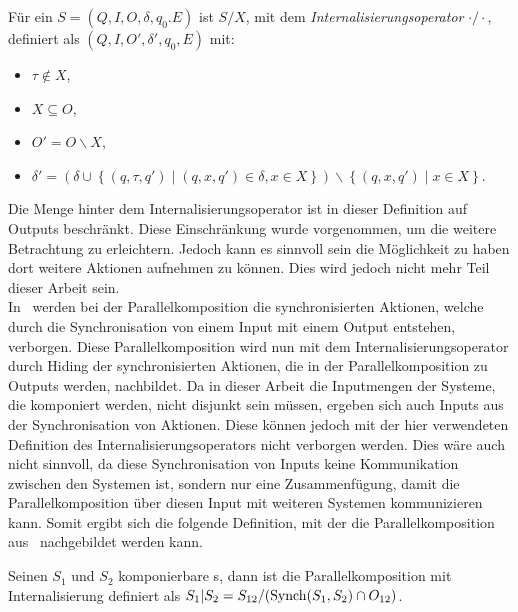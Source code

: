 \begin{Def}[Internalisierungsoperator]
  Für ein \EIO{} $S=(Q,I,O,\delta ,q_0.E)$ ist $S/X$, mit
  dem \emph{Internalisierungsoperator} $\cdot /\cdot$,
  definiert als $(Q,I,O',\delta ', q_0,E)$ mit:
  \begin{itemize}
    \item $\tau \notin X$,
    \item $X\subseteq O$,
    \item $O'=O\backslash X$,
    \item $\delta '=\left(\delta\cup\left\{(q,\tau ,q')\mid (q,x,q')\in\delta
      ,x\in X\right\}\right)\backslash \left\{(q,x,q')\mid x\in X\right\}$.
  \end{itemize}
\end{Def}

Die Menge hinter dem Internalisierungsoperator ist in dieser Definition auf
Outputs beschränkt. Diese Einschränkung wurde vorgenommen, um die weitere
Betrachtung zu erleichtern. Jedoch kann es sinnvoll sein die Möglichkeit zu
haben dort weitere Aktionen aufnehmen zu können. Dies wird jedoch nicht mehr
Teil dieser Arbeit sein.\\
In~\cite{Vogler2014EIO} werden bei der Parallelkomposition die synchronisierten
Aktionen, welche durch die Synchronisation von einem Input mit einem Output
entstehen, verborgen. Diese Parallelkomposition wird nun mit dem
Internalisierungsoperator durch Hiding der synchronisierten Aktionen, die in
der Parallelkomposition zu Outputs werden, nachbildet. Da in dieser Arbeit
die Inputmengen der Systeme, die komponiert werden, nicht disjunkt sein müssen,
ergeben sich auch Inputs aus der Synchronisation von Aktionen. Diese können
jedoch mit der hier verwendeten Definition des Internalisierungsoperators nicht verborgen
werden. Dies wäre auch nicht sinnvoll, da diese Synchronisation von Inputs
keine Kommunikation zwischen den Systemen ist, sondern nur eine Zusammenfügung,
damit die Parallelkomposition über diesen Input mit weiteren Systemen
kommunizieren kann. Somit ergibt sich die folgende Definition, mit der die
Parallelkomposition aus~\cite{Vogler2014EIO} nachgebildet werden kann.

\begin{Def}
\label{defIntParal}
  Seinen $S_1$ und $S_2$ komponierbare \EIO{}s, dann ist die
  Parallelkomposition mit Internalisierung definiert als $S_1|S_2 = S_{12}/(
  \mathrm{Synch}(S_1,S_2) \cap O_{12})$.
\end{Def}
